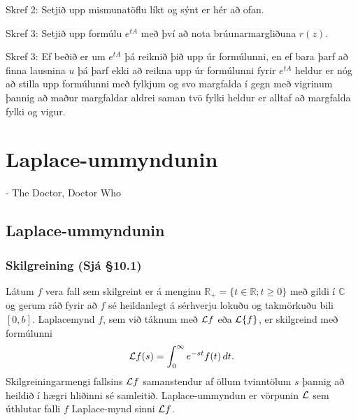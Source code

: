 \documentclass[a4paper,10pt,icelandic]{sphinxmanual}
\begin{document}
Skref 2: Setjið upp mismunatöflu líkt og sýnt er hér að ofan.

Skref 3: Setjið upp formúlu \(e^{tA}\) með því að nota
brúunarmargliðuna \(r(z)\).

Skref 3: Ef beðið er um \(e^{tA}\) þá reiknið þið upp úr formúlunni, en ef bara þarf að finna lausnina \(u\) þá þarf ekki að reikna upp úr formúlunni fyrir \(e^{tA}\) heldur er nóg að stilla upp formúlunni með fylkjum og svo margfalda í gegn með vigrinum þannig að maður margfaldar aldrei saman tvö fylki heldur er alltaf að margfalda fylki og vigur.


\chapter{Laplace-ummyndunin}
\label{\detokenize{Kafli10:laplace-ummyndunin}}\label{\detokenize{Kafli10::doc}}

- The Doctor, Doctor Who


\section{Laplace-ummyndunin}
\label{\detokenize{Kafli10:id1}}

\subsection{Skilgreining (Sjá \S{}10.1)}
\label{\detokenize{Kafli10:skilgreining-sja-10-1}}
Látum \(f\) vera fall sem skilgreint er á menginu \(\mathbb{R}_+=\{t\in \mathbb{R}; t\geq 0\}\) með gildi í \({\mathbb{C}}\) og gerum ráð fyrir að \(f\) sé heildanlegt á sérhverju lokuðu og takmörkuðu bili \([0,b]\). Laplace\textendash{}mynd \(f\), sem við táknum með \({\cal L} f\) eða \({\cal L}\{f\}\), er skilgreind með formúlunni
\begin{equation*}
\begin{split}{\cal L} f(s)=\int_0^ \infty e^{-st}f(t)\, dt.\label{7.1.1}\end{split}
\end{equation*}
Skilgreiningarmengi fallsins \({\cal L} f\) samanstendur af öllum tvinntölum \(s\) þannig að heildið í hægri hliðinni sé samleitið. Laplace-ummyndun er vörpunin \({\cal L}\) sem úthlutar falli \(f\) Laplace-mynd sinni \({\cal L} f\).
\end{document}
